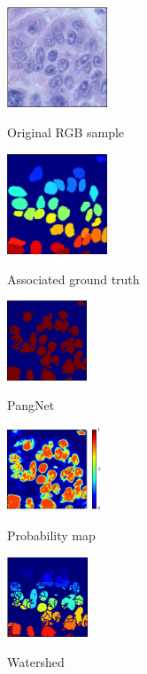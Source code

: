 \documentclass{article}
\begin{document}
\begin{figure}[htb]
\begin{minipage}[b]{.48\linewidth}
  \centering
  \centerline{\includegraphics[height=3.0cm]{RGB_pred}}
  \centerline{Original RGB sample}\medskip
\end{minipage}
\hfill
\begin{minipage}[b]{0.48\linewidth}
  \centering
  \centerline{\includegraphics[width=3.0cm]{GT_pred}}
  \centerline{Associated ground truth}\medskip
\end{minipage}


\begin{minipage}[b]{0.32\linewidth}
  \centering
  \centerline{\includegraphics[height=2.4cm]{BaochuanB}}
  \centerline{PangNet}\medskip
\end{minipage}
\hfill
\begin{minipage}[b]{.32\linewidth}
  \centering
  \centerline{\includegraphics[height=2.5cm]{BaochuanP}}
  \centerline{Probability map}\medskip
\end{minipage}
\hfill
\begin{minipage}[b]{.32\linewidth}
  \centering
  \centerline{\includegraphics[height=2.4cm]{Baochuan_WS}}
  \centerline{Watershed}\medskip
\end{minipage}


\end{figure}
\end{document}
